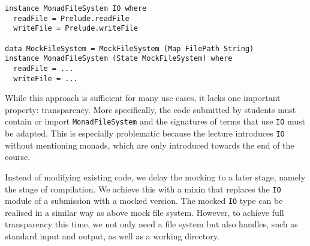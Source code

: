 \begin{verbatim}
instance MonadFileSystem IO where
  readFile = Prelude.readFile
  writeFile = Prelude.writeFile

data MockFileSystem = MockFileSystem (Map FilePath String)
instance MonadFileSystem (State MockFileSystem) where
  readFile = ...
  writeFile = ...
\end{verbatim}
While this approach is sufficient for many use cases,
it lacks one important property: transparency.
More specifically, the code submitted by students must contain or import \texttt{MonadFileSystem} and the signatures of terms that use \texttt{IO} must be adapted.
This is especially problematic because the lecture introduces \texttt{IO} without mentioning monads,
which are only introduced towards the end of the course.

Instead of modifying existing code,
we delay the mocking to a later stage,
namely the stage of compilation.
We achieve this with a mixin that replaces the \texttt{IO} module of a submission with a mocked version.
The mocked \texttt{IO} type can be realised in a similar way as above mock file system.
However, to achieve full transparency this time,
we not only need a file system but also handles, such as standard input and output, as well as a working directory.

